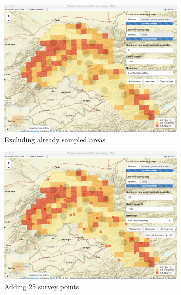 \documentclass[a4paper,11pt]{article} %
\begin{document}
\begin{figure}[htbp]
\centering
  \begin{subfigure}[b]{0.49\textwidth}
    \includegraphics[width=\textwidth]{mac-6}
    \caption{Excluding already sampled areas}
  \end{subfigure}
  \begin{subfigure}[b]{0.49\textwidth}
    \includegraphics[width=\textwidth]{mac-7}
    \caption{Adding 25 survey points}
  \end{subfigure} \\
    \begin{subfigure}[b]{0.49\textwidth}

\end{subfigure}
\end{figure}
\end{document}
